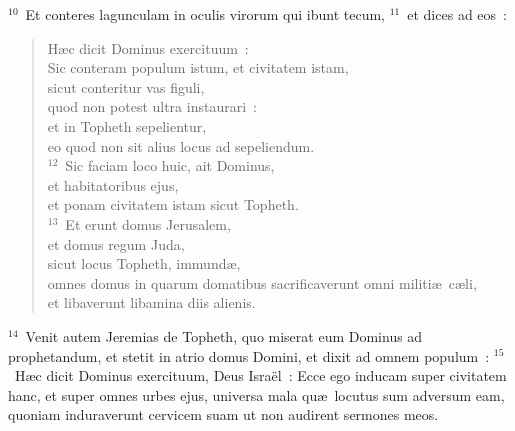 ${}^{10}$~Et conteres lagunculam in oculis virorum qui ibunt tecum,
${}^{11}$~et dices ad eos~: \begin{verse}H\ae c dicit Dominus exercituum~:\\ Sic conteram populum istum, et civitatem istam,\\ sicut conteritur vas figuli,\\ quod non potest ultra instaurari~:\\ et in Topheth sepelientur,\\ eo quod non sit alius locus ad sepeliendum.\\
${}^{12}$~Sic faciam loco huic, ait Dominus,\\ et habitatoribus ejus,\\ et ponam civitatem istam sicut Topheth.\\
${}^{13}$~Et erunt domus Jerusalem,\\ et domus regum Juda,\\ sicut locus Topheth, immund\ae ,\\ omnes domus in quarum domatibus sacrificaverunt omni militi\ae\ c\ae li,\\ et libaverunt libamina diis alienis.\end{verse}


${}^{14}$~Venit autem Jeremias de Topheth, quo miserat eum Dominus ad prophetandum, et stetit in atrio domus Domini, et dixit ad omnem populum~:
${}^{15}$~H\ae c dicit Dominus exercituum, Deus Isra\"el~: Ecce ego inducam super civitatem hanc, et super omnes urbes ejus, universa mala qu\ae\ locutus sum adversum eam, quoniam induraverunt cervicem suam ut non audirent sermones meos.

